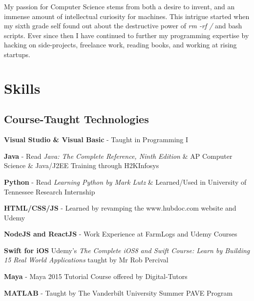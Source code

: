 \documentclass[letterpaper]{deedy-resume} %
\begin{document}
\hfill
%
%
\begin{minipage}[t]{0.66\textwidth} %


My passion for Computer Science stems from both a desire to invent,
and an immense amount of intellectual curiosity for machines. This
intrigue started when my sixth grade self found
out about the destructive power of {\it rm -rf /} and bash scripts.
Ever since then I have continued to further my programming
expertise by hacking on side-projects, freelance work,
reading books, and working at rising startups.
  


\section{Skills}

\subsection{Course-Taught Technologies}

\vspace{\topsep} %

\begin{tightitemize}

    \item \textbf{Visual Studio \& Visual Basic} - Taught in Programming I
    \item \textbf{Java} - Read \textit{Java: The Complete Reference, Ninth Edition} \& AP Computer Science \& Java/J2EE Training through H2KInfosys
    \item \textbf{Python} - Read \textit{Learning Python by Mark Lutz} \& Learned/Used in University of Tennessee Research Internship
    \item \textbf{HTML/CSS/JS} - Learned by revamping the www.hubdoc.com website and Udemy
    \item \textbf{NodeJS and ReactJS} - Work Experience at FarmLogs and Udemy Courses
    \item \textbf{Swift for iOS} Udemy's \textit{The Complete iOS8 and Swift Course: Learn by Building 15 Real World Applications} taught by Mr Rob Percival
    \item \textbf{Maya} - Maya 2015 Tutorial Course offered by Digital-Tutors
    \item \textbf{MATLAB} - Taught by The Vanderbilt University Summer PAVE Program
    

\end{tightitemize}
\end{minipage}
\end{document}

